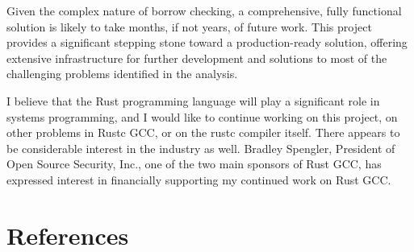\documentclass[
  11pt,
  twoside]{report}
\begin{document}
Given the complex nature of borrow checking, a comprehensive, fully
functional solution is likely to take months, if not years, of future
work. This project provides a significant stepping stone toward a
production-ready solution, offering extensive infrastructure for further
development and solutions to most of the challenging problems identified
in the analysis.

I believe that the Rust programming language will play a significant
role in systems programming, and I would like to continue working on
this project, on other problems in Rustc GCC, or on the rustc compiler
itself. There appears to be considerable interest in the industry as
well. Bradley Spengler, President of Open Source Security, Inc., one of
the two main sponsors of Rust GCC, has expressed interest in financially
supporting my continued work on Rust GCC.

\appendix

\cleardoublepage

\chapter{References}\label{sec:references}
\end{document}
